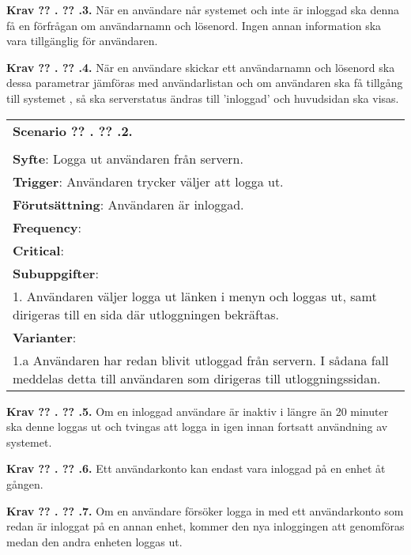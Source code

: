 \documentclass[a4paper]{article}
\newcommand\getcurrentref[1]{%
 \ifnumequal{\value{#1}}{0}
  {??}
  {\the\value{#1}}%
}
\newcommand\requirement[2]{
	\numberedrow{Krav}{#1}{#2}
}
\newcommand\scenario[2] {
	\numberedrow{Scenario}{#1}{#2}
}
\newcommand\numberedrow[3]{
	\noindent
	\textbf{#1 \getcurrentref{section}.\getcurrentref{subsection}.#2.} #3
	
}
\begin{document}
\requirement{3}{När en användare når systemet och inte är inloggad ska denna få en förfrågan om användarnamn och lösenord. Ingen annan information ska vara tillgänglig för användaren.}
\requirement{4}{När en användare skickar ett användarnamn och lösenord ska dessa parametrar jämföras med användarlistan och om användaren ska få tillgång till systemet , så ska serverstatus ändras till 'inloggad' och huvudsidan ska visas.}


\begin{table}[htbp]
\begin{tabular}{   |p{13cm}| }
   
        \hline

    \indent\scenario{2} \\ \\
    \textbf{Syfte}: Logga ut användaren från servern.\\
    \textbf{Trigger}: Användaren trycker väljer att logga ut. \\
    \textbf{Förutsättning}: Användaren är inloggad.\\
    \textbf{Frequency}: \\
    \textbf{Critical}: \\
    \hline



	\textbf{Subuppgifter}: \\

	 1. Användaren väljer logga ut länken i menyn och loggas ut, samt dirigeras till en sida där utloggningen bekräftas.\\ \hline
    \textbf{Varianter}: \\
	1.a Användaren har redan blivit utloggad från servern. I sådana fall meddelas detta till användaren som dirigeras till utloggningssidan. \\
	    \hline


\end{tabular}
\end{table}


\requirement{5}{Om en inloggad användare är inaktiv i längre än 20 minuter ska denne loggas ut och tvingas att logga in igen innan fortsatt användning av systemet.}
\requirement{6}{Ett användarkonto kan endast vara inloggad på en enhet åt gången.}
\requirement{7}{Om en användare försöker logga in med ett användarkonto som redan är inloggat på en annan enhet, kommer den nya inloggingen att genomföras medan den andra enheten loggas ut.}
\end{document}
